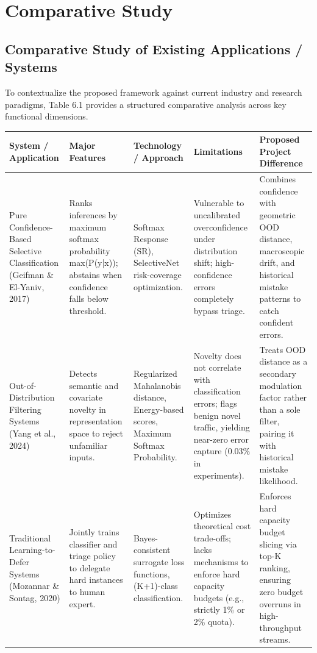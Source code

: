 \chapter{Comparative Study}

\section{Comparative Study of Existing Applications / Systems}

To contextualize the proposed framework against current industry and research paradigms, Table 6.1 provides a structured comparative analysis across key functional dimensions.

\begin{table}[H]
\centering
\small
\begin{tabular}{p{} p{} p{} p{} p{}}
\toprule
\textbf{System / Application} & \textbf{Major Features} & \textbf{Technology / Approach} & \textbf{Limitations} & \textbf{Proposed Project Difference} \\
\midrule
Pure Confidence-Based Selective Classification (Geifman \& El-Yaniv, 2017) & Ranks inferences by maximum softmax probability max(P(y|x)); abstains when confidence falls below threshold. & Softmax Response (SR), SelectiveNet risk-coverage optimization. & Vulnerable to uncalibrated overconfidence under distribution shift; high-confidence errors completely bypass triage. & Combines confidence with geometric OOD distance, macroscopic drift, and historical mistake patterns to catch confident errors. \\
Out-of-Distribution Filtering Systems (Yang et al., 2024) & Detects semantic and covariate novelty in representation space to reject unfamiliar inputs. & Regularized Mahalanobis distance, Energy-based scores, Maximum Softmax Probability. & Novelty does not correlate with classification errors; flags benign novel traffic, yielding near-zero error capture (0.03\% in experiments). & Treats OOD distance as a secondary modulation factor rather than a sole filter, pairing it with historical mistake likelihood. \\
Traditional Learning-to-Defer Systems (Mozannar \& Sontag, 2020) & Jointly trains classifier and triage policy to delegate hard instances to human expert. & Bayes-consistent surrogate loss functions, (K+1)-class classification. & Optimizes theoretical cost trade-offs; lacks mechanisms to enforce hard capacity budgets (e.g., strictly 1\% or 2\% quota). & Enforces hard capacity budget slicing via top-K ranking, ensuring zero budget overruns in high-throughput streams. \\

\end{tabular}
\end{table}
